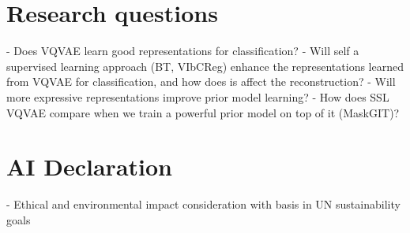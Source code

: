 \documentclass[../../thesis.tex]{subfiles}
\begin{document}
\section{Research questions}
	- Does VQVAE learn good representations for classification?
	- Will self a supervised learning approach (BT, VIbCReg) enhance the representations learned from VQVAE for classification, and how does is affect the reconstruction? 
	- Will more expressive representations improve prior model learning?
	- How does SSL VQVAE compare when we train a powerful prior model on top of it (MaskGIT)? 



\section{AI Declaration}

- Ethical and environmental impact consideration with basis in UN sustainability goals
\end{document}
